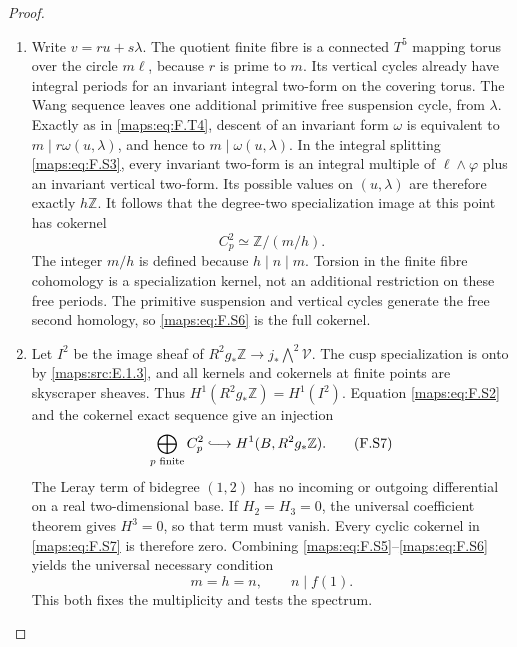 \documentclass[11pt,a4paper]{article}
\theoremstyle{definition}
\begin{document}
\begin{proof}
\begin{enumerate}[label=\arabic*.]
\item Write $v=ru+s\lambda$.  The quotient finite fibre is a
connected $T^5$ mapping torus over the circle $m\ell$,
because $r$ is prime to $m$.
Its vertical cycles already have integral periods for an
invariant integral two-form on the covering torus.
The Wang sequence leaves one additional primitive free
suspension cycle, from $\lambda$.
Exactly as in \eqref{maps:eq:F.T4}, descent of an invariant form $\omega$
is equivalent to
$m\mid r\omega(u,\lambda)$, and hence to
$m\mid\omega(u,\lambda)$.
In the integral splitting \eqref{maps:eq:F.S3}, every invariant two-form
is an integral multiple of $\ell\wedge\varphi$ plus an
invariant vertical two-form.  Its possible values on
$(u,\lambda)$ are therefore exactly $h\mathbb Z$.
It follows that the degree-two specialization image at
this point has cokernel
\[
 C^2_p\simeq\mathbb Z/(m/h).
 \tag{F.S6}\label{maps:eq:F.S6}
\]
The integer $m/h$ is defined because $h\mid n\mid m$.
Torsion in the finite fibre cohomology is a specialization
kernel, not an additional restriction on these free periods.
The primitive suspension and vertical cycles generate the
free second homology, so \eqref{maps:eq:F.S6} is the full cokernel.

\item Let $I^2$ be the image sheaf of
$R^2g_*\mathbb Z\to j_*\bigwedge^2\mathcal V$.
The cusp specialization is onto by \ref{maps:src:E.1.3}, and all kernels
and cokernels at finite points are skyscraper sheaves.
Thus $H^1(R^2g_*\mathbb Z)=H^1(I^2)$.
Equation \eqref{maps:eq:F.S2} and the cokernel exact sequence give an
injection
\[
 \bigoplus_{p\text{ finite}}C^2_p
           \lhook\joinrel\longrightarrow H^1(B,R^2g_*\mathbb Z).
 \tag{F.S7}\label{maps:eq:F.S7}
\]
The Leray term of bidegree $(1,2)$ has no incoming or
outgoing differential on a real two-dimensional base.
If $H_2=H_3=0$, the universal coefficient theorem gives
$H^3=0$, so that term must vanish.
Every cyclic cokernel in \eqref{maps:eq:F.S7} is therefore zero.
Combining \eqref{maps:eq:F.S5}--\eqref{maps:eq:F.S6} yields the universal necessary
condition
\[
 m=h=n,\qquad n\mid f(1).
 \tag{F.S8}\label{maps:eq:F.S8}
\]
This both fixes the multiplicity and tests the spectrum.


\end{enumerate}
\end{proof}
\end{document}
